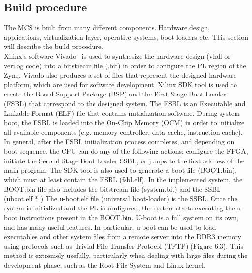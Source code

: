 \subsection{Build procedure}
The MCS is built from many different components. Hardware design,  applications, virtualization layer, operative systems, boot loaders etc. This section will describe the build procedure.\\ %

Xilinx's software Vivado~\cite{website:vivado} is used to synthesize the hardware design (vhdl or verilog code) into a bitstream file (.bit) in order to configure the PL region of the Zynq. Vivado also produces a set of files that represent the designed hardware platform, which are used for software development. Xilinx SDK tool is used to create the Board Support Package (BSP) and the First Stage Boot Loader (FSBL) that correspond to the designed system. The FSBL is an Executable and Linkable Format (ELF) file that contains initialization software. During system boot, the FSBL is loaded into the On-Chip Memory (OCM) in order to initialize all available components (e.g. memory controller, data cache, instruction cache). In general, after the FSBL initialization process completes, and depending on boot sequence, the CPU can do any of the following actions: configure the FPGA, initiate the Second Stage Boot Loader SSBL, or jumps to the first address of the main program. The SDK tool is also used to generate a boot file (BOOT.bin), which must at least contain the FSBL (fsbl.elf). In the implemented system, the BOOT.bin file also includes the bitstream file (system.bit) and the SSBL (uboot.elf * ) The u-boot.elf file (universal boot-loader) is the SSBL. Once the system is initialized and the PL is configured, the system starts executing the u-boot instructions present in the BOOT.bin. U-boot is a full system on its own, and has many useful features. In particular, u-boot can be used to load executables and other system files from a remote server into the DDR3 memory using protocols such as Trivial File Transfer Protocol (TFTP) (Figure 6.3). This method is extremely usefully, particularly when dealing with large files during the development phase, such as the Root File System and Linux kernel.

